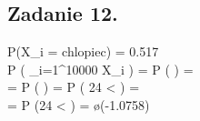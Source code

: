 \subsection{Zadanie 12.}
P(X_i = chlopiec) = 0.517 \\
P \biggl ( \sum_{i=1}^{10000} X_i  \biggr ) = P \biggl (  \le {} \biggr ) =
\\ = P \biggl (  \le {} \biggr ) = P \biggl ( 24 <  \biggr ) =
\\ = P \biggl (24 <  \biggr ) = \o (-1.0758)
